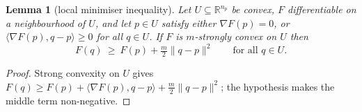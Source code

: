 \documentclass[11pt]{article}
\newtheorem{lemma}{Lemma}
\theoremstyle{remark}\newtheorem{remark}{Remark}
\newcommand{\norm}[1]{\lVert #1\rVert}
\begin{document}
\begin{lemma}[local minimiser inequality]\label{lem:vi_local}
Let $U\subseteq\mathbb R^{n_p}$ be convex, $F$ differentiable on a neighbourhood of $U$, and let $p\in U$ satisfy either $\nabla F(p)=0$, or $\langle\nabla F(p),q-p\rangle\ge0$ for all $q\in U$. If $F$ is $m$-strongly convex on $U$ then
\begin{equation}
F(q)\ \ge\ F(p)+\tfrac m2\norm{q-p}^2\qquad\text{for all }q\in U .
\label{eq:vi_local}
\end{equation}
\end{lemma}
\begin{proof}
Strong convexity on $U$ gives $F(q)\ge F(p)+\langle\nabla F(p),q-p\rangle+\tfrac m2\norm{q-p}^2$; the hypothesis makes the middle term non-negative.
\end{proof}
\end{document}
